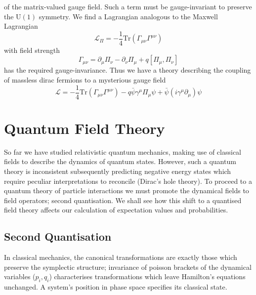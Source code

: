 \documentclass[11pt, a4paper]{article}
\theoremstyle{definition}
\theoremstyle{plain}
\begin{document}
of the matrix-valued gauge field. Such a term must be gauge-invariant to preserve
the $\mathrm{U}(1)$ symmetry. We find a Lagrangian analogous to the Maxwell Lagrangian
\begin{equation}
  \mathcal{L}_\Pi = - \frac{1}{4}\mathrm{Tr}(\Gamma_{\mu\nu}\Gamma^{\mu\nu})
\end{equation}
with field strength
\begin{equation}
  \Gamma_{\mu\nu} = \partial_\mu\Pi_\nu - \partial_\nu\Pi_\mu +q[\Pi_\mu, \Pi_\nu]
\end{equation}
has the required gauge-invariance. Thus we have a theory describing the coupling
of massless dirac fermions to a mysterious gauge field
\begin{equation}
  \mathcal{L} =  - \frac{1}{4}\mathrm{Tr}(\Gamma_{\mu\nu}\Gamma^{\mu\nu}) 
  - q\bar{\psi}\gamma^\mu\Pi_\mu\psi
  + \bar{\psi}(i\gamma^\mu \partial_\mu)\psi
\end{equation}


\section{Quantum Field Theory}

So far we have studied relativistic quantum mechanics, making use of classical
fields to describe the dynamics of quantum states. However, such a quantum theory is
inconsistent subsequently predicting negative energy states which require 
peculiar interpretations to reconcile (Dirac's hole theory). To proceed to a
quantum theory of particle interactions we must promote the dynamical fields
to field operators; second quantisation. We shall see how this shift to
a quantised field theory affects our calculation of expectation values and probabilities.


\subsection{Second Quantisation}
In classical mechanics, the canonical transformations are exactly those which preserve the symplectic 
structure; invariance of poisson brackets of the dynamical variables ($p_i, q_i$) characterises
transformations which leave Hamilton's equations unchanged.
A system's position in phase space specifies its classical state.
\end{document}
